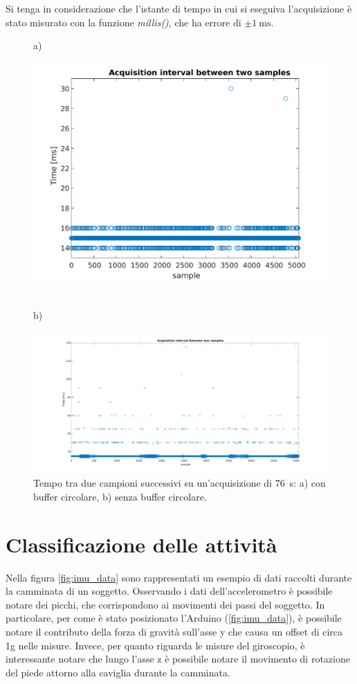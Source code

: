 Si tenga in considerazione che l'istante di tempo in cui si eseguiva l'acquisizione è stato misurato con la funzione \textit{millis()}, che ha errore di $\pm \SI{1}{\milli\second}$. 
\begin{figure}[tbh]
	\centering
	a)
	\begin{minipage}{.900\textwidth}
		\includegraphics[width=0.8\linewidth]{./ImageFiles/interval_time.pdf}
	\end{minipage}
	\\b)
	\begin{minipage}{.900\textwidth}
		\includegraphics[width=\linewidth]{./ImageFiles/interval_time_2}
	\end{minipage}
	\caption{Tempo tra due campioni successivi su un'acquisizione di \SI{76}{\second}: a) con buffer circolare, b) senza buffer circolare.}
	\label{fig:time_interval}
\end{figure}

\clearpage

\section{Classificazione delle attività} \label{classifSect}
Nella figura \ref{fig:imu_data} sono rappresentati un esempio di dati raccolti durante la camminata di un soggetto. Osservando i dati dell'accelerometro è possibile notare dei picchi, che corrispondono ai movimenti dei passi del soggetto. In particolare, per come è stato posizionato l'Arduino (\Fig\ref{fig:imu_data}), è possibile notare il contributo della forza di gravità sull'asse y che causa un offset di circa 1g nelle misure. Invece, per quanto riguarda le misure del giroscopio, è interessante notare che lungo l'asse z è possibile notare il movimento di rotazione del piede attorno alla caviglia durante la camminata. 

